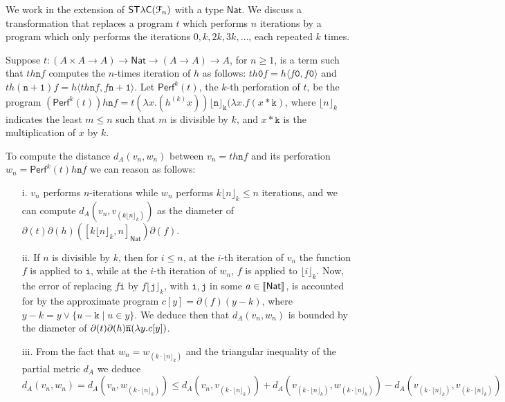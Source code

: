 \begin{example}
We work in the extension of $\mathsf{ST\lambda C}(\mathcal F_{n})$ with a type $\mathsf{Nat}$.
We discuss a transformation that replaces a program $t$ which performs $n$ iterations by a program which only performs the iterations $0,k,2k,3k,\dots$, each repeated $k$ times. 

Suppose  $t: (A\times A\to A) \to \mathsf{Nat}\to (A\to A)\to A$, for $n\geq 1$, is a term such that $th\mathtt n f$ 
computes the $n$-times iteration of $h$ as follows: $th \mathtt 0f= h\langle f\mathtt 0, f\mathtt 0\rangle$ and $th(\mathtt{n+1})f=h\langle th\mathtt n f, f\mathtt{n+1}\rangle$. 
Let $\mathsf{Perf}^{k}(t)$, the $k$-th perforation of $t$, be the program   
$(\mathsf{Perf}^{k}(t))h\mathtt nf= t(\lambda x. (h^{(k)}x)) \mathtt{\lfloor n\rfloor_{k}} (\lambda x. f(x* \mathtt k)$, where $\lfloor n\rfloor_{k}$ indicates the least $m\leq n$ such that $m$ is divisible by $k$, and $x*\mathtt k$ is the multiplication of $x$ by $k$. 





To compute the distance 
$d_{A}(v_{n},w_{n}    )$ between  $v_{n}=th\mathtt n f $ and its perforation $w_{n}=\mathsf{Perf}^{k}(t)h\mathtt nf$  we can reason as follows: 
\begin{itemize}

\item[i.] $v_{n}$ performs $n$-iterations while $w_{n}$ performs $k\lfloor n\rfloor_{k}  \leq n$ iterations, and we can compute  
$d_{A}(v_{n}, v_{(k \lfloor n\rfloor_{k})})$ as the diameter of 
$\partial(t)\partial(h)([ k \lfloor n\rfloor_{k}, n]_{\mathsf{Nat}}) \partial(f)$.




\item[ii.] If $n$ is divisible by $k$, then for $i\leq n$, at the $i$-th iteration of $v_{n}$ the function $f$ is applied  to $\mathtt i$, while at the $i$-th iteration of $w_{n}$, $f$ is applied to $\lfloor i\rfloor_{k}$. Now, the error of replacing  $f\mathtt i$ by $ f\lfloor \mathtt j\rfloor_{k}$, with $\mathtt i,\mathtt j$ in some $a\in \llbracket \mathsf{Nat} \rrbracket$, is accounted for by the approximate program $c[y]= \partial(f)(y-k  )$, where $y-k= y \vee \{u-\mathtt k\mid u \in y\}$.
We deduce then that 
$d_{A}(v_{n}, w_{n})$ is bounded by the diameter of $\partial(t)\partial(h)\overline{\mathtt n} (\lambda y.c[y])$.

\item[iii.] From the fact that $w_{n}=w_{(k\cdot \lfloor n\rfloor_{k})}$ and the triangular inequality of the partial metric $d_{A}$ we deduce  
$d_{A}(v_{n}, w_{n})=
d_{A}(v_{n},w_{(k\cdot \lfloor n\rfloor_{k})}) \leq
d_{A}(v_{n}, v_{(k\cdot \lfloor n\rfloor_{k})})+
d_{A}(v_{(k\cdot \lfloor n\rfloor_{k})}, w_{(k\cdot \lfloor n\rfloor_{k})})-
d_{A}(v_{(k\cdot \lfloor n\rfloor_{k})},v_{(k\cdot \lfloor n\rfloor_{k})} )$



\end{itemize}
\end{example}
